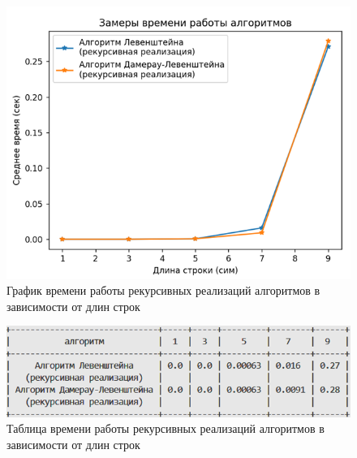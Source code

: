 \begin{figure}[H]
    \centering
    \includegraphics[width=1\textwidth]{img/graph_rec.png}
    \caption{График времени работы рекурсивных реализаций алгоритмов в зависимости от длин строк}
\end{figure}
\begin{figure}[H]
    \centering
    \includegraphics[width=1\textwidth]{img/table_rec.png}
    \caption{Таблица времени работы рекурсивных реализаций алгоритмов в зависимости от длин строк}
\end{figure}

